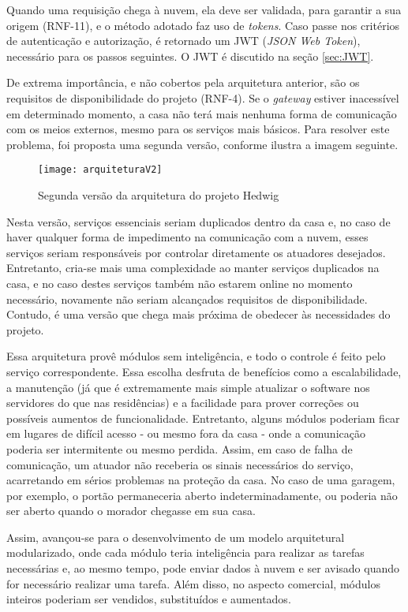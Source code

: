 Quando uma requisição chega à nuvem, ela deve ser validada, para garantir a sua origem (RNF-11), e o método adotado faz uso de \emph{tokens}.  Caso passe nos critérios de autenticação e autorização, é retornado um JWT (\textit{JSON Web Token}), necessário para os passos seguintes. O JWT é discutido na seção \ref{sec:JWT}.

De extrema importância, e não cobertos pela arquitetura anterior, são os requisitos de disponibilidade do projeto (RNF-4). Se o \textit{gateway} estiver inacessível em determinado momento, a casa não terá mais nenhuma forma de comunicação com os meios externos, mesmo para os serviços mais básicos. Para resolver este problema, foi proposta uma segunda versão, conforme ilustra a imagem seguinte.

\begin{figure}[H]
	\centering
	\caption{Segunda versão da arquitetura do projeto Hedwig}
  \texttt{[image: arquiteturaV2]}
\label{fig:arquiteturaV2}
\end{figure}

Nesta versão, serviços essenciais seriam duplicados dentro da casa e, no caso de haver qualquer forma de impedimento na comunicação com a nuvem, esses serviços seriam responsáveis por controlar diretamente os atuadores desejados. Entretanto, cria-se mais uma complexidade ao manter serviços duplicados na casa, e no caso destes serviços também não estarem online no momento necessário, novamente não seriam alcançados requisitos de disponibilidade. Contudo, é uma versão que chega mais próxima de obedecer às necessidades do projeto.

Essa arquitetura provê módulos sem inteligência, e todo o controle é feito pelo serviço correspondente. Essa escolha desfruta de benefícios como a escalabilidade, a manutenção (já que é extremamente mais simple atualizar o software nos servidores do que nas residências) e a facilidade para prover correções ou possíveis aumentos de funcionalidade. Entretanto, alguns módulos poderiam ficar em lugares de difícil acesso - ou mesmo fora da casa - onde a comunicação poderia ser intermitente ou mesmo perdida. Assim, em caso de falha de comunicação, um atuador não receberia os sinais necessários do serviço, acarretando em sérios problemas na proteção da casa. No caso de uma garagem, por exemplo, o portão permaneceria aberto indeterminadamente, ou poderia não ser aberto quando o morador chegasse em sua casa.

Assim, avançou-se para o desenvolvimento de um modelo arquitetural modularizado, onde cada módulo teria inteligência para realizar as tarefas necessárias e, ao mesmo tempo, pode enviar dados à nuvem e ser avisado quando for necessário realizar uma tarefa. Além disso, no aspecto comercial, módulos inteiros poderiam ser vendidos, substituídos e aumentados.

